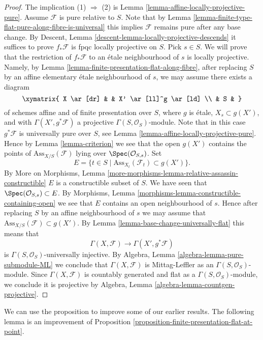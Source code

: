 \begin{proof}
The implication (1) $\Rightarrow$ (2) is
Lemma \ref{lemma-affine-locally-projective-pure}.
Assume $\mathcal{F}$ is pure relative to $S$.
Note that by
Lemma \ref{lemma-finite-type-flat-pure-along-fibre-is-universal}
this implies $\mathcal{F}$ remains pure after any base change. By
Descent, Lemma \ref{descent-lemma-locally-projective-descends}
it suffices to prove $f_*\mathcal{F}$ is fpqc locally projective on $S$.
Pick $s \in S$. We will prove that the restriction of
$f_*\mathcal{F}$ to an \'etale neighbourhood of $s$ is locally projective.
Namely, by
Lemma \ref{lemma-finite-presentation-flat-along-fibre},
after replacing $S$ by an affine elementary \'etale
neighbourhood of $s$, we may assume there exists a diagram
$$
\xymatrix{
X \ar[dr] & & X' \ar[ll]^g \ar[ld] \\
& S &
}
$$
of schemes affine and of finite presentation over $S$,
where $g$ is \'etale, $X_s \subset g(X')$, and with
$\Gamma(X', g^*\mathcal{F})$ a projective $\Gamma(S, \mathcal{O}_S)$-module.
Note that in this case $g^*\mathcal{F}$ is universally pure over $S$, see
Lemma \ref{lemma-affine-locally-projective-pure}.
Hence by
Lemma \ref{lemma-criterion}
we see that the open $g(X')$ contains the points of
$\text{Ass}_{X/S}(\mathcal{F})$ lying over $\Spec(\mathcal{O}_{S, s})$.
Set
$$
E = \{t \in S \mid \text{Ass}_{X_t}(\mathcal{F}_t) \subset g(X') \}.
$$
By
More on Morphisms,
Lemma \ref{more-morphisms-lemma-relative-assassin-constructible}
$E$ is a constructible subset of $S$. We have seen that
$\Spec(\mathcal{O}_{S, s}) \subset E$. By
Morphisms, Lemma \ref{morphisms-lemma-constructible-containing-open}
we see that $E$ contains an open neighbourhood of $s$. Hence after
replacing $S$ by an affine neighbourhood of $s$ we may assume that
$\text{Ass}_{X/S}(\mathcal{F}) \subset g(X')$.
By
Lemma \ref{lemma-base-change-universally-flat}
this means that
$$
\Gamma(X, \mathcal{F}) \longrightarrow \Gamma(X', g^*\mathcal{F})
$$
is $\Gamma(S, \mathcal{O}_S)$-universally injective.
By Algebra, Lemma \ref{algebra-lemma-pure-submodule-ML}
we conclude that $\Gamma(X, \mathcal{F})$ is Mittag-Leffler as an
$\Gamma(S, \mathcal{O}_S)$-module. Since
$\Gamma(X, \mathcal{F})$ is countably generated and flat as a
$\Gamma(S, \mathcal{O}_S)$-module, we conclude
it is projective by
Algebra, Lemma \ref{algebra-lemma-countgen-projective}.
\end{proof}

\noindent
We can use the proposition to improve some of our earlier results.
The following lemma is an improvement of
Proposition \ref{proposition-finite-presentation-flat-at-point}.

